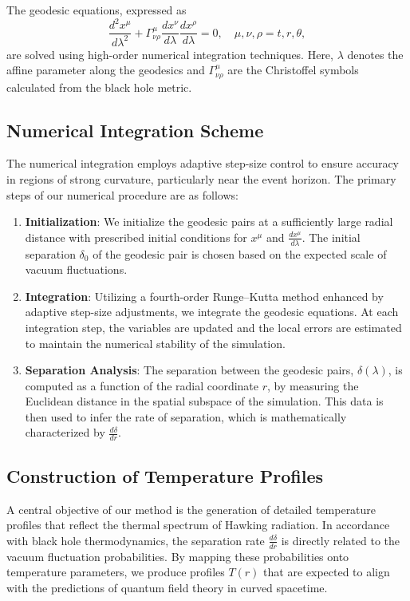 \documentclass{article}\usepackage[utf8]{inputenc} %
\begin{document}
The geodesic equations, expressed as
\begin{equation}
\frac{d^2x^{\mu}}{d\lambda^2}+\Gamma^{\mu}_{\nu\rho}\frac{dx^{\nu}}{d\lambda}\frac{dx^{\rho}}{d\lambda}=0, \quad \mu,\nu,\rho=t, r, \theta,
\end{equation}
are solved using high-order numerical integration techniques. Here, $\lambda$ denotes the affine parameter along the geodesics and $\Gamma^{\mu}_{\nu\rho}$ are the Christoffel symbols calculated from the black hole metric. 

\subsection{Numerical Integration Scheme}
The numerical integration employs adaptive step-size control to ensure accuracy in regions of strong curvature, particularly near the event horizon. The primary steps of our numerical procedure are as follows:
\begin{enumerate}
    \item \textbf{Initialization}: We initialize the geodesic pairs at a sufficiently large radial distance with prescribed initial conditions for $x^{\mu}$ and $\frac{dx^{\mu}}{d\lambda}$. The initial separation $\delta_0$ of the geodesic pair is chosen based on the expected scale of vacuum fluctuations.
    \item \textbf{Integration}: Utilizing a fourth-order Runge–Kutta method enhanced by adaptive step-size adjustments, we integrate the geodesic equations. At each integration step, the variables are updated and the local errors are estimated to maintain the numerical stability of the simulation.
    \item \textbf{Separation Analysis}: The separation between the geodesic pairs, $\delta(\lambda)$, is computed as a function of the radial coordinate $r$, by measuring the Euclidean distance in the spatial subspace of the simulation. This data is then used to infer the rate of separation, which is mathematically characterized by $\frac{d\delta}{dr}$.
\end{enumerate}

\subsection{Construction of Temperature Profiles}
A central objective of our method is the generation of detailed temperature profiles that reflect the thermal spectrum of Hawking radiation. In accordance with black hole thermodynamics, the separation rate $\frac{d\delta}{dr}$ is directly related to the vacuum fluctuation probabilities. By mapping these probabilities onto temperature parameters, we produce profiles $T(r)$ that are expected to align with the predictions of quantum field theory in curved spacetime.
\end{document}

